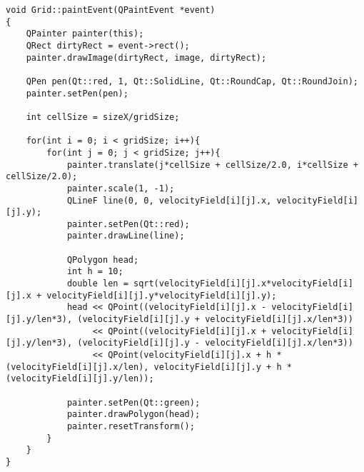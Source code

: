 \documentclass[15pt, titlepage]{article}
\begin{document}
\begin{lstlisting}
void Grid::paintEvent(QPaintEvent *event)
{
    QPainter painter(this);
    QRect dirtyRect = event->rect();
    painter.drawImage(dirtyRect, image, dirtyRect);

    QPen pen(Qt::red, 1, Qt::SolidLine, Qt::RoundCap, Qt::RoundJoin);
    painter.setPen(pen);

    int cellSize = sizeX/gridSize;

    for(int i = 0; i < gridSize; i++){
        for(int j = 0; j < gridSize; j++){
            painter.translate(j*cellSize + cellSize/2.0, i*cellSize + cellSize/2.0);
            painter.scale(1, -1);
            QLineF line(0, 0, velocityField[i][j].x, velocityField[i][j].y);
            painter.setPen(Qt::red);
            painter.drawLine(line);

            QPolygon head;
            int h = 10;
            double len = sqrt(velocityField[i][j].x*velocityField[i][j].x + velocityField[i][j].y*velocityField[i][j].y);
            head << QPoint((velocityField[i][j].x - velocityField[i][j].y/len*3), (velocityField[i][j].y + velocityField[i][j].x/len*3))
                 << QPoint((velocityField[i][j].x + velocityField[i][j].y/len*3), (velocityField[i][j].y - velocityField[i][j].x/len*3))
                 << QPoint(velocityField[i][j].x + h * (velocityField[i][j].x/len), velocityField[i][j].y + h * (velocityField[i][j].y/len));

            painter.setPen(Qt::green);
            painter.drawPolygon(head);
            painter.resetTransform();
        }
    }
}
\end{lstlisting}
\end{document}
